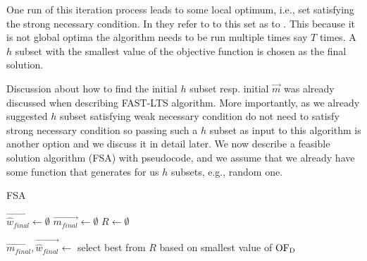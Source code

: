 One run of this iteration process leads to some local optimum, i.e., set satisfying the strong necessary condition. In \cite{hawkins:1994} they refer to to this set as to .
This because it is not global optima the algorithm needs to be run multiple times say $T$ times. A $h$  subset with the smallest value of the objective function is chosen as the final solution.

Discussion about how to find the initial $h$ subset resp. initial $\vec{m}$ was already discussed when describing FAST-LTS algorithm.
More importantly, as we already suggested $h$ subset satisfying weak necessary condition do not need to satisfy strong necessary condition so passing such a $h$ subset as input to this algorithm is another option and we discuss it in detail later. We now describe a feasible solution algorithm (FSA) with pseudocode, and we assume that we already have some function that generates for us $h$ subsets, e.g., random one. 

\newcommand\mycommfont[1]{\footnotesize\ttfamily\textcolor{blue}{#1}}

\begin{algorithm}[H]
    \label{alg:feasible_solution}
        
    \caption{FSA}
    $\vec{\hat{w}_{final}} \gets \emptyset$\;
    $\vec{m_{final}} \gets \emptyset$\;
    $R \gets \emptyset$\;

    $\vec{m_{final}}, \vec{\hat{w}_{final}}  \gets $ select best from $R$ based on smallest value of $\operatorname{OF_D}$\;
    \;
\end{algorithm}



